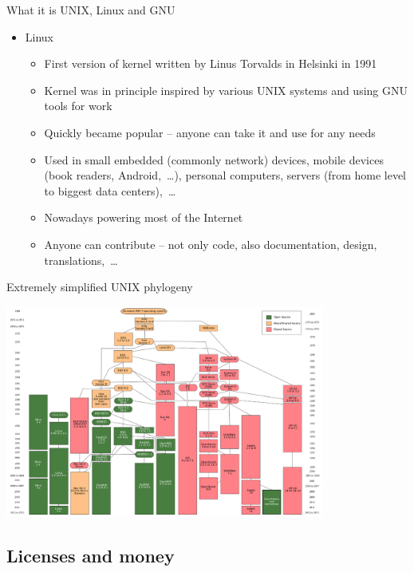 \documentclass[compress, ucs, xelatex, 11pt, xcolor=svgnames,
  hyperref={
    bookmarks=true,
    unicode=true,
    colorlinks=true,
    pdftitle={Linux, command line and MetaCentrum},
    plainpages=false,
    pdfauthor={Vojtech Zeisek},
    pdfsubject={Course about use of Linux command line, writing shell scripts and using MetaCentrum of CESNET},
    pdfcreator={XeLaTeX},
    pdfkeywords={Linux, GNU, BASH, shell, command line, MetaCentrum},
    linkcolor=DarkRed,
    anchorcolor=DarkBlue,
    citecolor=Indigo,
    filecolor=NavyBlue,
    menucolor=DarkMagenta,
    urlcolor=DarkBlue,
    pdftex},
  url={hyphens, lowtilde} %
  ]{beamer}
\begin{document}
\begin{frame}[allowframebreaks]{What it is UNIX, Linux and GNU}
\begin{itemize}
\begin{itemize}
      \item Source code is free -- anyone can study it (Security!), report bugs, contribute, modify, share it,~\ldots
      \item GNU General Public License (GPL) -- free spirit of open-source -- license, idea, how to share software
    \end{itemize}
    \item Linux
    \begin{itemize}
      \item First version of kernel written by Linus Torvalds in Helsinki in 1991
      \item Kernel was in principle inspired by various UNIX systems and using GNU tools for work
      \item Quickly became popular -- anyone can take it and use for any needs
      \item Used in small embedded (commonly network) devices, mobile devices (book readers, Android,~\ldots), personal computers, servers (from home level to biggest data centers),~\ldots
      \item Nowadays powering most of the Internet
      \item Anyone can contribute -- not only code, also documentation, design, translations,~\ldots
    \end{itemize}
  \end{itemize}
\end{frame}

\begin{frame}{Extremely simplified UNIX phylogeny}
  \begin{center}
    \includegraphics[height=7cm]{unix_history-simple.png}
  \end{center}
\end{frame}

\subsection{Licenses and money}
\end{document}
